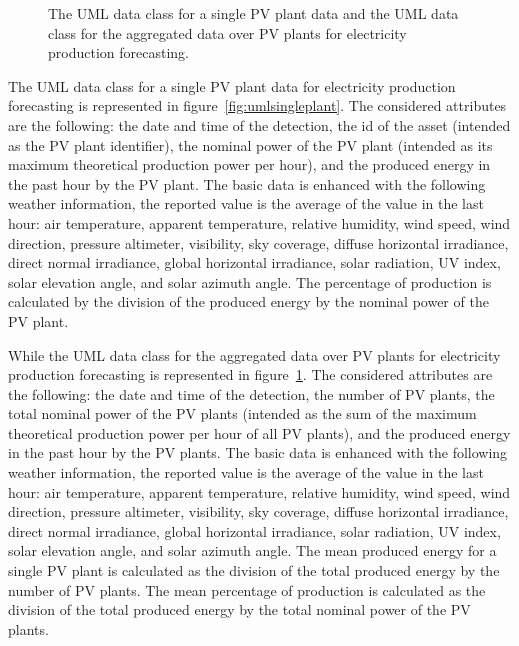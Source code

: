 \begin{figure}[H]
\begin{minipage}[b]{8.5cm}
\subcaption{}
\label{fig:umlproduction}
\end{minipage}
\caption{ The UML data class for a single PV plant data and  the UML data class for the aggregated data over PV plants for electricity production forecasting.}
\end{figure}

The UML data class for a single PV plant data for electricity production forecasting is represented in figure~\ref{fig:umlsingleplant}.
The considered attributes are the following: the date and time of the detection, the id of the asset (intended as the PV plant identifier), the nominal power of the PV plant (intended as its maximum theoretical production power per hour), and the produced energy in the past hour by the PV plant.
The basic data is enhanced with the following weather information, the reported value is the average of the value in the last hour: air temperature, apparent temperature, relative humidity, wind speed, wind direction, pressure altimeter, visibility, sky coverage, diffuse horizontal irradiance, direct normal irradiance, global horizontal irradiance, solar radiation, UV index, solar elevation angle, and solar azimuth angle.
The percentage of production is calculated by the division of the produced energy by the nominal power of the PV plant.

While the UML data class for the aggregated data over PV plants for electricity production forecasting is represented in figure~\ref{fig:umlproduction}.
The considered attributes are the following: the date and time of the detection, the number of PV plants, the total nominal power of the PV plants (intended as the sum of the maximum theoretical production power per hour of all PV plants), and the produced energy in the past hour by the PV plants.
The basic data is enhanced with the following weather information, the reported value is the average of the value in the last hour: air temperature, apparent temperature, relative humidity, wind speed, wind direction, pressure altimeter, visibility, sky coverage, diffuse horizontal irradiance, direct normal irradiance, global horizontal irradiance, solar radiation, UV index, solar elevation angle, and solar azimuth angle.
The mean produced energy for a single PV plant is calculated as the division of the total produced energy by the number of PV plants.
The mean percentage of production is calculated as the division of the total produced energy by the total nominal power of the PV plants.

